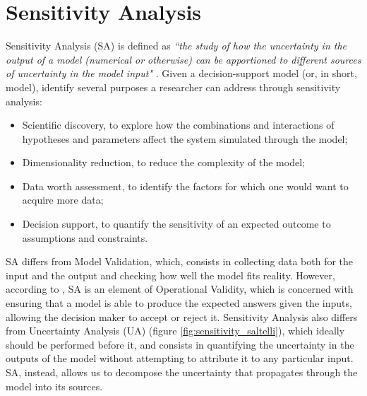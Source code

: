 
\section{Sensitivity Analysis} \label{sec:ch2_sa}

Sensitivity Analysis (SA) is defined as \textit{``the study of how the uncertainty in the output of a model  (numerical or otherwise)  can  be  apportioned to  different  sources  of uncertainty in the model input"} \cite{Saltelli2002SensitivityAF}. 
Given a decision-support model (or, in short, model), \textcite{RAZAVI2021104954} identify several purposes a researcher can address through sensitivity analysis:
\begin{itemize}
    \item Scientific discovery, to explore how the combinations and interactions of hypotheses and parameters affect the system simulated through the model;
    \item Dimensionality reduction, to reduce the complexity of the model;
    \item Data worth assessment, to identify the factors for which one would want to acquire more data;
    \item Decision support, to quantify the sensitivity of an expected outcome to assumptions and constraints.
\end{itemize}

SA differs from Model Validation, which, consists in collecting data both for the input and the output and checking how well the model fits reality. However, according to \textcite{Gass1983FeatureA}, SA is an element of Operational Validity, which is concerned with ensuring that a model is able to produce the expected answers given the inputs, allowing the decision maker to accept or reject it.
Sensitivity Analysis also differs from Uncertainty Analysis (UA) (figure \ref{fig:sensitivity_saltelli}), which ideally should be performed before it, and consists in quantifying the uncertainty in the outputs of the model without attempting to attribute it to any particular input. SA, instead, allows us to decompose the uncertainty that propagates through the model into its sources.

